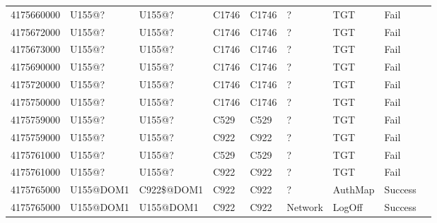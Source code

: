 \begin{table}[htbp]
{\begin{tabular}{lllllllll}
			4175660000 & U155@? & U155@? & C1746 & C1746 & ? & TGT & Fail \\
			4175672000 & U155@? & U155@? & C1746 & C1746 & ? & TGT & Fail \\
			4175673000 & U155@? & U155@? & C1746 & C1746 & ? & TGT & Fail \\
			4175690000 & U155@? & U155@? & C1746 & C1746 & ? & TGT & Fail \\
			4175720000 & U155@? & U155@? & C1746 & C1746 & ? & TGT & Fail \\
			4175750000 & U155@? & U155@? & C1746 & C1746 & ? & TGT & Fail \\
			4175759000 & U155@? & U155@? & C529 & C529 & ? & TGT & Fail \\
			4175759000 & U155@? & U155@? & C922 & C922 & ? & TGT & Fail \\
			4175761000 & U155@? & U155@? & C529 & C529 & ? & TGT & Fail \\
			4175761000 & U155@? & U155@? & C922 & C922 & ? & TGT & Fail \\
			4175765000 & U155@DOM1 & C922\$@DOM1 & C922 & C922 & ? & AuthMap & Success \\
			4175765000 & U155@DOM1 & U155@DOM1 & C922 & C922 & Network & LogOff & Success
		\end{tabular}
	}
\end{table}